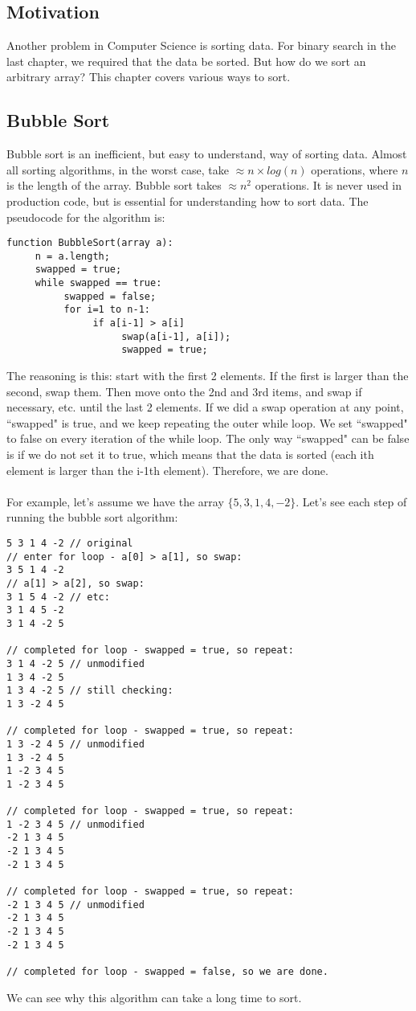 
\subsection{Motivation}
Another problem in Computer Science is sorting data. For binary search in the last chapter, we required that the data be sorted. But how do we sort an arbitrary array? This chapter covers various ways to sort.

\subsection{Bubble Sort}
Bubble sort is an inefficient, but easy to understand, way of sorting data. Almost all sorting algorithms, in the worst case, take $\approx n \times log(n)$ operations, where $n$ is the length of the array. Bubble sort takes $\approx n^2$ operations. It is never used in production code, but is essential for understanding how to sort data. The pseudocode for the algorithm is:
\begin{verbatim}
function BubbleSort(array a):
     n = a.length;
     swapped = true;
     while swapped == true:
          swapped = false;
          for i=1 to n-1:
               if a[i-1] > a[i]
                    swap(a[i-1], a[i]);
                    swapped = true;
\end{verbatim}
The reasoning is this: start with the first 2 elements. If the first is larger than the second, swap them. Then move onto the 2nd and 3rd items, and swap if necessary, etc. until the last 2 elements. If we did a swap operation at any point, ``swapped" is true, and we keep repeating the outer while loop. We set ``swapped" to false on every iteration of the while loop. The only way ``swapped" can be false is if we do not set it to true, which means that the data is sorted (each ith element is larger than the i-1th element). Therefore, we are done.
\\ \\
For example, let's assume we have the array $\{5, 3, 1, 4, -2\}$. Let's see each step of running the bubble sort algorithm:
\begin{verbatim}
5 3 1 4 -2 // original
// enter for loop - a[0] > a[1], so swap:
3 5 1 4 -2
// a[1] > a[2], so swap:
3 1 5 4 -2 // etc:
3 1 4 5 -2
3 1 4 -2 5

// completed for loop - swapped = true, so repeat:
3 1 4 -2 5 // unmodified
1 3 4 -2 5
1 3 4 -2 5 // still checking:
1 3 -2 4 5

// completed for loop - swapped = true, so repeat:
1 3 -2 4 5 // unmodified
1 3 -2 4 5
1 -2 3 4 5
1 -2 3 4 5

// completed for loop - swapped = true, so repeat:
1 -2 3 4 5 // unmodified
-2 1 3 4 5
-2 1 3 4 5
-2 1 3 4 5

// completed for loop - swapped = true, so repeat:
-2 1 3 4 5 // unmodified
-2 1 3 4 5
-2 1 3 4 5
-2 1 3 4 5

// completed for loop - swapped = false, so we are done.
\end{verbatim}
We can see why this algorithm can take a long time to sort.

